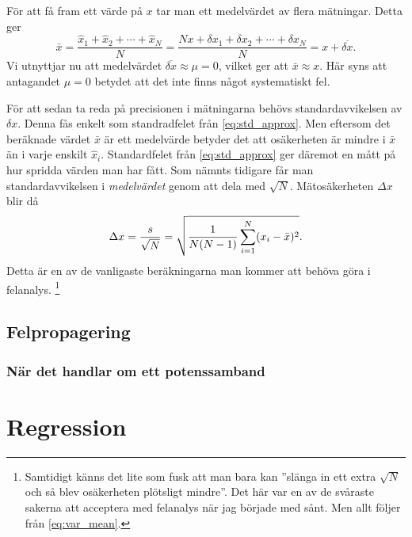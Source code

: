 \documentclass[11pt,a4paper, english, swedish
]{article}
\begin{document}
För att få fram ett värde på $x$ tar man ett medelvärdet av flera
mätningar. Detta ger
\begin{equation}
\bar{x}=\frac{\hat{x}_1+\hat{x}_2 + \cdots + \hat{x}_N}{N} 
= \frac{Nx+\delta{x}_1+\delta{x}_2 + \cdots + \delta{x}_N}{N}
= x + \overline{\delta{x}}.
\end{equation}
Vi utnyttjar nu att medelvärdet
$\overline{\delta{x}}\approx\mu=0$, vilket ger att $\bar{x}\approx x$.
Här syns att antagandet $\mu=0$ betydet att det inte finns något
systematiskt fel.

För att sedan ta reda på precisionen i mätningarna behövs
standardavvikelsen av $\delta{x}$. Denna fås enkelt som standradfelet
från \eqref{eq:std_approx}. Men eftersom det beräknade värdet
$\bar{x}$ är ett medelvärde betyder det att osäkerheten är mindre i
$\bar{x}$ än i varje enskilt $\hat{x}_i$. Standardfelet från
\eqref{eq:std_approx} ger däremot en mått på hur spridda värden man
har fått. Som nämnts tidigare får man standardavvikelsen i
\emph{medelvärdet} genom att dela med
$\sqrt{N}$. Mätosäkerheten\footnotemark{} $\Delta{x}$ blir då
\begin{equation} \label{eq:Delta_x}
\Large
\Delta{x} = \frac{s}{\sqrt{N}} 
= \sqrt{\frac{1}{N(N-1)}\sum_{i=1}^N (x_i-\bar{x})^2}.
\end{equation}
Detta är en av de vanligaste beräkningarna man kommer att behöva göra
i felanalys. \footnote{
  Samtidigt känns det lite som fusk att man bara kan ''slänga in ett
  extra $\sqrt{N}$ och så blev osäkerheten plötsligt mindre''.
  Det här var en av de svåraste sakerna att acceptera med felanalys
  när jag började med sånt. Men allt följer från \eqref{eq:var_mean}.
}


\subsection{Felpropagering}


\subsubsection{När det handlar om ett potenssamband}

\section{Regression}
\end{document}
